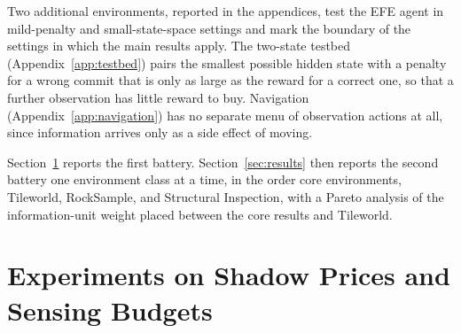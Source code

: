 Two additional environments, reported in the appendices, test the EFE agent in mild-penalty and small-state-space settings and mark the boundary of the settings in which the main results apply. The two-state testbed (Appendix~\ref{app:testbed}) pairs the smallest possible hidden state with a penalty for a wrong commit that is only as large as the reward for a correct one, so that a further observation has little reward to buy. Navigation (Appendix~\ref{app:navigation}) has no separate menu of observation actions at all, since information arrives only as a side effect of moving.

Section~\ref{sec:budget_experiments} reports the first battery. Section~\ref{sec:results} then reports the second battery one environment class at a time, in the order core environments, Tileworld, RockSample, and Structural Inspection, with a Pareto analysis of the information-unit weight placed between the core results and Tileworld.

\section{Experiments on Shadow Prices and Sensing Budgets}
\label{sec:budget_experiments}

